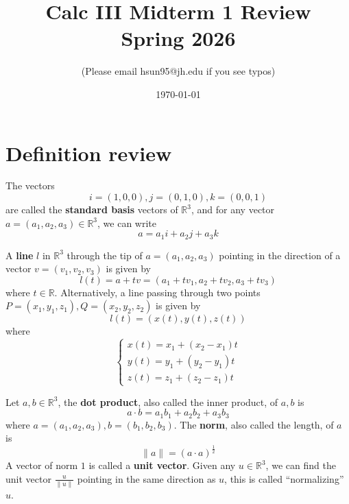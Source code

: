 \documentclass[openany]{book}
\title{Calc III Midterm 1 Review
\\ 
\vspace{0.4cm}
\large Spring 2026}
\author{(Please email hsun95@jh.edu if you see typos)}
\date{\today}
\newcommand{\R}{\mathbb{R}}
\begin{document}
\maketitle

\tableofcontents
\newpage


\chapter{Definition review}



\begin{defn}[standard basis in $\R^3$]
    The vectors 
    \begin{equation*}
        i=(1,0,0), j=(0,1,0), k=(0,0,1)
    \end{equation*}
    are called the \textbf{standard basis} vectors of $\R^3$, and for any vector $a=(a_1,a_2,a_3)\in\R^3$, we can write 
    \begin{equation*}
        a=a_1i+a_2j+a_3k
    \end{equation*}
\end{defn}




\begin{defn}\label{line}
    A \textbf{line} $l$ in $\R^3$ through the tip of $a=(a_1,a_2,a_3)$ pointing in the direction of a vector $v=(v_1,v_2,v_3)$ is given by 
    \begin{equation*}
        l(t)=a+tv=(a_1+tv_1, a_2+tv_2, a_3+tv_3)
    \end{equation*}
    where $t\in\R$. Alternatively, a line passing through two points $P=(x_1,y_1,z_1), Q=(x_2,y_2,z_2)$ is given by 
    \begin{equation*}
        l(t)=(x(t), y(t), z(t))
    \end{equation*}
    where 
    \begin{equation*}
        \begin{cases}
            x(t)=x_1+(x_2-x_1)t\\
            y(t)=y_1+(y_2-y_1)t\\
            z(t)=z_1+(z_2-z_1)t
        \end{cases}
    \end{equation*}
\end{defn}



\begin{defn}
    Let $a,b\in\R^3$, the \textbf{dot product}, also called the inner product, of $a,b$ is 
    \begin{equation*}
        a\cdot b=a_1b_1+a_2b_2+a_3b_3
    \end{equation*}
    where $a=(a_1,a_2,a_3), b=(b_1,b_2,b_3)$. The \textbf{norm}, also called the length, of $a$ is 
    \begin{equation*}
        \|a\|=(a\cdot a)^\frac{1}{2}
    \end{equation*}
    A vector of norm $1$ is called a \textbf{unit vector}. Given any $u\in\R^3$, we can find the unit vector $\frac{u}{\|u\|}$ pointing in the same direction as $u$, this is called ``normalizing'' $u$.
\end{defn}
\end{document}
